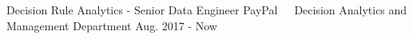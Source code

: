 \documentclass[11pt, a4paper, UTF8]{awesome-cv}
\begin{document}
%
\begin{cventries}
  \cventry
    {Decision Rule Analytics - Senior Data Engineer} %
    {PayPal{\ \cdotp\ \ }Decision Analytics and Management Department} %
    {Aug. 2017 - Now} %
    {\ } %
    {
      \begin{cvitems} %

\end{cvitems}}
\end{cventries}
\end{document}
